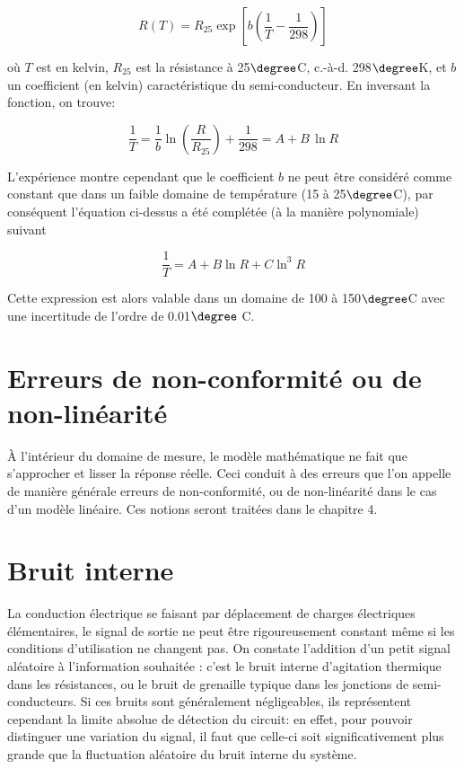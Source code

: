 \begin{equation}
    R(T) = R_{25}\exp{\left[b\left(\frac{1}{T}-\frac{1}{298}\right)\right]}
\end{equation}

où $T$ est en kelvin, $R_{25}$ est la résistance à 25$\degree$C, c.-à-d. 298$\degree$K, et $b$ un coefficient (en kelvin) caractéristique du semi-conducteur. En inversant la fonction, on trouve:

\begin{equation}
    \frac{1}{T} = \frac{1}{b}\ln{\left(\frac{R}{R_{25}}\right)}+\frac{1}{298} = A + B\,\ln{R}
\end{equation}

L'expérience montre cependant que le coefficient $b$ ne peut être considéré comme constant que dans un faible domaine de température (15 à 25$\degree$C), par conséquent l'équation ci-dessus a été complétée (à la manière polynomiale) suivant

\begin{equation}
    \frac{1}{T} = A + B \ln{R} + C \ln^3{R}
\end{equation}

Cette expression est alors valable dans un domaine de 100 à 150$\degree$C avec une incertitude de l'ordre de 0.01$\degree$ C.

\section{Erreurs de non-conformité ou de non-linéarité}

À l'intérieur du domaine de mesure, le modèle mathématique ne fait que s'approcher et lisser la réponse réelle. Ceci conduit à des erreurs que l'on appelle de manière générale erreurs de non-conformité, ou de non-linéarité dans le cas d'un modèle linéaire. Ces notions seront traitées dans le chapitre 4.

\section{Bruit interne}

La conduction électrique se faisant par déplacement de charges électriques élémentaires, le signal de sortie ne peut être rigoureusement constant même si les conditions d'utilisation ne changent pas. On constate l'addition d'un petit signal aléatoire à l'information souhaitée : c'est le bruit interne d'agitation thermique dans les résistances, ou le bruit de grenaille typique dans les jonctions de semi-conducteurs. Si ces bruits sont généralement négligeables, ils représentent cependant la limite absolue de détection du circuit: en effet, pour pouvoir distinguer une variation du signal, il faut que celle-ci soit significativement plus grande que la fluctuation aléatoire du bruit interne du système.

